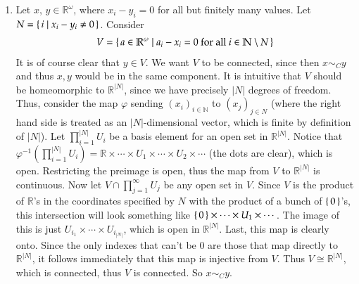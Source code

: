 \documentclass[12pt]{article}
\theoremstyle{definitionstyle}
\def\mbb#1{\mathbb{#1}}
\def\bN{\mbb{N}}
\def \R{\mbb{R}}
\def \cph{\varphi}
\begin{document}
\begin{enumerate}[leftmargin=\labelsep]
		\item Let $x$, $y \in \R^\omega$, where $x_i-y_i = 0$ for all but finitely many values. Let $N = \set{i | x_i-y_i \neq 0}$. Consider
		\begin{align*}
			V = \set{a \in \R^\omega | a_i - x_i = 0 \text{ for all $i \in \bN \setminus N$}}
		\end{align*}
		It is of course clear that $y \in V$. We want $V$ to be connected, since then $x \sim_C y$ and thus $x,y$ would be in the same component. It is intuitive that $V$ should be homeomorphic to $\R^{|N|}$, since we have precisely $|N|$ degrees of freedom. Thus, consider the map $\cph$ sending $(x_i)_{i \in \bN}$ to $(x_j)_{j \in N}$ (where the right hand side is treated as an $|N|$-dimensional vector, which is finite by definition of $|N|$). Let $\prod_{i=1}^{|N|} U_i$ be a basis element for an open set in $\R^{|N|}$. Notice that $\cph^{-1}(\prod_{i=1}^{|N|} U_i) = \R \times \cdots \times U_{1} \times \cdots \times U_{2} \times \cdots$ (the dots are clear), which is open. Restricting the preimage is open, thus the map from $V$ to $\R^{|N|}$ is continuous. Now let $V \cap \prod_{j=1}^\infty U_j$ be any open set in $V$. Since $V$ is the product of $\R$'s in the coordinates specified by $N$ with the product of a bunch of $\set{0}$'s, this intersection will look something like $\set{0} \times \cdots \times U_1 \times \cdots$. The image of this is just $U_{i_1} \times \cdots \times U_{i_{|N|}}$, which is open in $\R^{|N|}$. Last, this map is clearly onto. Since the only indexes that can't be 0 are those that map directly to $\R^{|N|}$, it follows immediately that this map is injective from $V$. Thus $V \cong \R^{|N|}$, which is connected, thus $V$ is connected. So $x \sim_C y$.
		

\end{enumerate}
\end{document}
